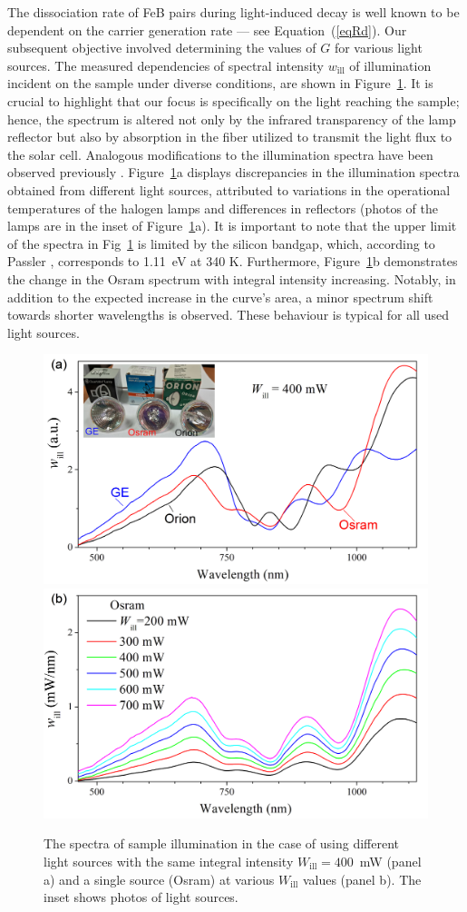 \documentclass{WileyMSP-template}
\begin{document}
The dissociation rate of FeB pairs during light-induced decay is well known
to be dependent on the carrier generation rate --- see Equation~(\ref{eqRd}).
Our subsequent objective involved determining the values of $G$ for various light sources.
The measured dependencies of spectral intensity $w_\mathrm{ill}$ of illumination incident on the sample under diverse conditions,
are shown in Figure~\ref{fig4}.
It is crucial to highlight that our focus is specifically on the light reaching the sample;
hence, the spectrum is altered not only by the infrared transparency of the lamp reflector but also by absorption in the fiber
utilized to transmit the light flux to the solar cell.
Analogous modifications to the illumination spectra have been observed previously \cite{Libra2017}.
Figure~\ref{fig4}a displays discrepancies in the illumination spectra obtained from different light sources,
attributed to variations in the operational temperatures of the halogen lamps and differences in reflectors
(photos of the lamps are in the inset of Figure~\ref{fig4}a).
It is important to note that the upper limit of the spectra in Fig~\ref{fig4}
is limited by the silicon bandgap, which, according to Passler \cite{Pasler}, corresponds to 1.11~eV at 340 K.
Furthermore, Figure~\ref{fig4}b demonstrates the change in the Osram spectrum with integral intensity increasing.
Notably, in addition to the expected increase in the curve's area, a minor spectrum shift towards shorter wavelengths is observed.
These behaviour is typical for all used light sources.



\begin{figure}
\centering
  \includegraphics[width=0.4\linewidth]{Fig4a.png}
  \includegraphics[width=0.4\linewidth]{Fig4b.png}
  \caption{
  The spectra of sample illumination in the case of using different light sources
  with the same integral intensity $W_\mathrm{ill}=400$~mW (panel a) and a single source (Osram)
 at various $W_\mathrm{ill}$ values (panel b).
 The inset shows photos of light sources.
}
  \label{fig4}
\end{figure}
\end{document}
